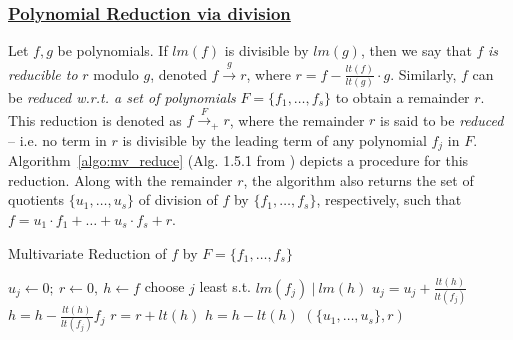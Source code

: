 \subsubsection{\underline{Polynomial Reduction via division}} Let $f,
g$ be 
polynomials. If $lm(f)$ is divisible by $lm(g)$, then we say that $f$
{\it is reducible to} $r$ modulo $g$, denoted
$f\stackrel{g}{\textstyle\longrightarrow}r$, where
$r = f - {\frac{lt(f)}{lt(g)}} \cdot g$. Similarly, $f$ can be {\it
  reduced  w.r.t. a set of polynomials}  $F = \{f_1, \dots, f_s\}$ to
obtain a remainder $r$. This reduction is denoted as $f \stackrel{F}
{\textstyle \longrightarrow}_+ r$, where the remainder $r$ is said to
be {\it reduced} -- i.e. no term in $r$ is divisible by the leading
term of any polynomial $f_j$ in $F$. Algorithm~\ref{algo:mv_reduce}
(Alg. 1.5.1 from \cite{gb_book}) depicts a procedure for this
reduction. Along with the remainder $r$, the algorithm also returns
the set of quotients $\{u_1,\dots,u_s\}$ of division of $f$ by
$\{f_1,\dots,f_s\}$, respectively, such that $f = u_1\cdot
f_1+\dots+u_s\cdot f_s + r$. 

{\small
\begin{algorithm}[hbt]
 \caption{Multivariate Reduction of $f$ by $F=\{f_1,\dots,f_s\}$}
 \label{algo:mv_reduce}
 \begin{algorithmic}[1]
 \State $u_j \gets 0; ~r \gets 0, ~h \gets f $ 
 \State choose $j$ least s.t. $lm(f_j) ~|~ lm(h)$
 \State $u_j = u_j + \frac{lt(h)}{lt(f_j)}$
 \State $h = h - \frac{lt(h)}{lt(f_j)} f_j$
 \Else
 \State $r = r+ lt(h)$
 \State $h = h - lt(h)$
 \EndIf
 \EndWhile
 \State \Return $(\{u_1,\dots,u_s\} , r)$
 \EndProcedure
 \end{algorithmic}
 \end{algorithm}
}

\vspace{0.040in}
